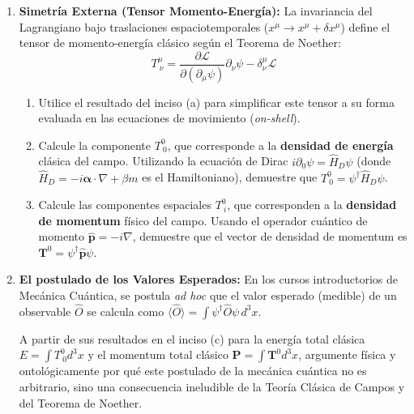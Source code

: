 \begin{enumerate}
    \item \textbf{Simetría Externa (Tensor Momento-Energía):} 
    La invariancia del Lagrangiano bajo traslaciones espaciotemporales ($x^\mu \to x^\mu + \delta x^\mu$) define el tensor de momento-energía clásico según el Teorema de Noether:
    \begin{equation*}
        T^\mu_{\ \nu} = \frac{\partial \mathcal{L}}{\partial(\partial_\mu \psi)}\partial_\nu \psi - \delta^\mu_\nu \mathcal{L}
    \end{equation*}
    \begin{enumerate}
        \item Utilice el resultado del inciso (a) para simplificar este tensor a su forma evaluada en las ecuaciones de movimiento (\textit{on-shell}).
        \item Calcule la componente $T^0_{\ 0}$, que corresponde a la \textbf{densidad de energía} clásica del campo. Utilizando la ecuación de Dirac $i\partial_0 \psi = \hat{H}_D \psi$ (donde $\hat{H}_D = -i\boldsymbol{\alpha}\cdot\nabla + \beta m$ es el Hamiltoniano), demuestre que $T^0_{\ 0} = \psi^\dagger \hat{H}_D \psi$.
        \item Calcule las componentes espaciales $T^0_{\ i}$, que corresponden a la \textbf{densidad de momentum} físico del campo. Usando el operador cuántico de momento $\mathbf{\hat{p}} = -i\nabla$, demuestre que el vector de densidad de momentum es $\mathbf{T}^0 = \psi^\dagger \mathbf{\hat{p}} \psi$.
    \end{enumerate}

    \item \textbf{El postulado de los Valores Esperados:} 
    En los cursos introductorios de Mecánica Cuántica, se postula \textit{ad hoc} que el valor esperado (medible) de un observable $\hat{O}$ se calcula como $\langle \hat{O} \rangle = \int \psi^\dagger \hat{O} \psi \, d^3x$. 
    
    A partir de sus resultados en el inciso (c) para la energía total clásica $E = \int T^0_{\ 0} d^3x$ y el momentum total clásico $\mathbf{P} = \int \mathbf{T}^0 d^3x$, argumente física y ontológicamente por qué este postulado de la mecánica cuántica no es arbitrario, sino una consecuencia ineludible de la Teoría Clásica de Campos y del Teorema de Noether.

\end{enumerate}


  
%
